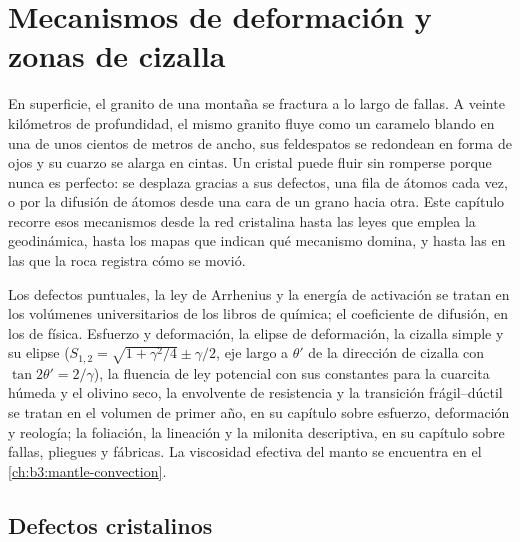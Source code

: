 \chapter{Mecanismos de deformación y zonas de cizalla}\label{ch:b3:deformation-mechanisms}

En superficie, el granito de una montaña se fractura a lo largo de fallas.
A veinte kilómetros de profundidad, el mismo granito fluye como un caramelo blando en una  de unos
cientos de metros de ancho, sus feldespatos se redondean en forma de ojos y su cuarzo se alarga
en cintas. Un cristal puede fluir sin romperse porque nunca es perfecto:
se desplaza gracias a sus defectos, una fila de átomos cada vez, o por la difusión de átomos desde
una cara de un grano hacia otra. Este capítulo recorre esos mecanismos desde la
red cristalina hasta las leyes que emplea la geodinámica, hasta los mapas que indican qué
mecanismo domina, y hasta las  en las que la roca registra cómo se movió.

\begin{recall}
Los defectos puntuales, la ley de Arrhenius y la energía de activación se tratan en los
volúmenes universitarios de los libros de química; el coeficiente de difusión, en los de
física. Esfuerzo y deformación, la elipse de deformación, la cizalla simple y su elipse
($S_{1,2} = \sqrt{1 + \gamma^2/4} \pm \gamma/2$, eje largo a $\theta'$ de la
dirección de cizalla con $\tan2\theta' = 2/\gamma$), la fluencia de ley potencial con sus
constantes para la cuarcita húmeda y el olivino seco, la envolvente de resistencia y la
transición frágil--dúctil se tratan en el volumen de primer año, en su capítulo sobre
esfuerzo, deformación y reología; la foliación, la lineación y la
milonita descriptiva, en su capítulo sobre fallas, pliegues y fábricas. La viscosidad efectiva
del manto se encuentra en el \cref{ch:b3:mantle-convection}.
\end{recall}

\section{Defectos cristalinos}

